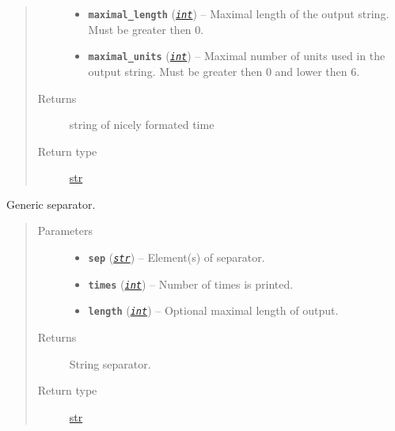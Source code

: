 \documentclass[a4paper,10pt,english]{sphinxmanual}
\begin{document}
\begin{fulllineitems}
\begin{quote}
\begin{description}
\begin{itemize}
\item {} 
\textbf{\texttt{maximal\_length}} (\href{http://docs.python.org/2/library/functions.html\#int}{\emph{\texttt{int}}}) -- Maximal length of the output string. Must be greater then 0.

\item {} 
\textbf{\texttt{maximal\_units}} (\href{http://docs.python.org/2/library/functions.html\#int}{\emph{\texttt{int}}}) -- Maximal number of units used in the output string. Must be greater then 0 and lower then 6.

\end{itemize}

\item[{Returns}] \leavevmode
string of nicely formated time

\item[{Return type}] \leavevmode
\href{http://docs.python.org/2/library/functions.html\#str}{str}

\end{description}\end{quote}

\end{fulllineitems}


\begin{fulllineitems}
\label{aqueduct.utils.log:aqueduct.utils.log.gsep}
Generic separator.
\begin{quote}\begin{description}
\item[{Parameters}] \leavevmode\begin{itemize}
\item {} 
\textbf{\texttt{sep}} (\href{http://docs.python.org/2/library/functions.html\#str}{\emph{\texttt{str}}}) -- Element(s) of separator.

\item {} 
\textbf{\texttt{times}} (\href{http://docs.python.org/2/library/functions.html\#int}{\emph{\texttt{int}}}) -- Number of times  is printed.

\item {} 
\textbf{\texttt{length}} (\href{http://docs.python.org/2/library/functions.html\#int}{\emph{\texttt{int}}}) -- Optional maximal length of output.

\end{itemize}

\item[{Returns}] \leavevmode
String separator.

\item[{Return type}] \leavevmode
\href{http://docs.python.org/2/library/functions.html\#str}{str}

\end{description}\end{quote}

\end{fulllineitems}
\end{document}

